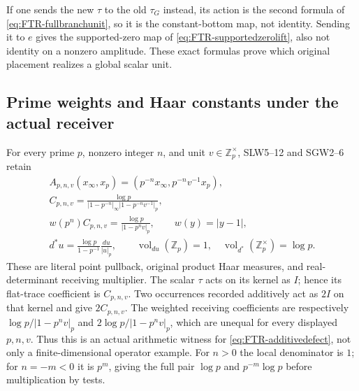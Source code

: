 If one sends the new $\tau$ to the old $\tau_G$ instead, its
action is the second formula of \eqref{eq:FTR-fullbranchunit},
so it is the constant-bottom map, not identity. Sending it to
$e$ gives the supported-zero map of
\eqref{eq:FTR-supportedzerolift}, also not identity on a
nonzero amplitude. These exact formulas prove which original
placement realizes a global scalar unit.

\subsection{Prime weights and Haar constants under the actual receiver}

For every prime $p$, nonzero integer $n$, and unit
$v\in\mathbb Z_p^\times$, SLW5--12 and SGW2--6 retain
\begin{equation}\tag{FTR11}\label{eq:FTR-primefull}
 \begin{gathered}
 A_{p,n,v}(x_\infty,x_p)
       =(p^{-n}x_\infty,p^{-n}v^{-1}x_p),\\
 C_{p,n,v}=
 \frac{\log p}{|1-p^{-n}|_\infty|1-p^{-n}v^{-1}|_p},\\
 w(p^n)C_{p,n,v}=\frac{\log p}{|1-p^nv|_p},\qquad
 w(y)=|y-1|,\\
 d^*u=\frac{\log p}{1-p^{-1}}\frac{du}{|u|_p},\qquad
 \operatorname{vol}_{du}(\mathbb Z_p)=1,\quad
 \operatorname{vol}_{d^*}(\mathbb Z_p^\times)=\log p.
 \end{gathered}
\end{equation}
These are literal point pullback, original product Haar measures,
and real-determinant receiving multiplier.
The scalar $\tau$ acts on its kernel as $I$; hence its flat-trace
coefficient is $C_{p,n,v}$.
Two occurrences recorded additively act as $2I$ on that kernel
and give $2C_{p,n,v}$. The weighted receiving coefficients are
respectively $\log p/|1-p^nv|_p$ and
$2\log p/|1-p^nv|_p$, which are unequal for every displayed
$p,n,v$. Thus this is an actual arithmetic witness for
\eqref{eq:FTR-additivedefect}, not only a finite-dimensional
operator example. For $n>0$ the local denominator is $1$;
for $n=-m<0$ it is $p^m$, giving the full pair
$\log p$ and $p^{-m}\log p$ before multiplication by tests.

